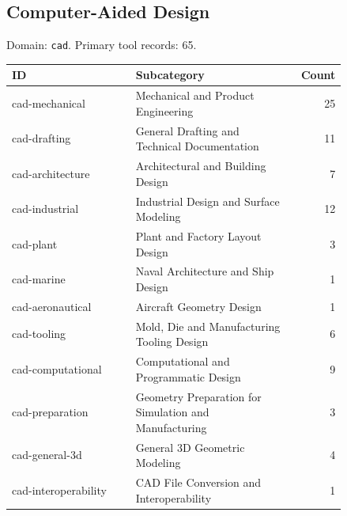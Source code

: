 \subsection{Computer-Aided Design}
\noindent Domain: \texttt{cad}. Primary tool records: 65.
\begin{longtable}{p{0.37\linewidth}p{0.47\linewidth}r}
ID & Subcategory & Count\\\hline\endhead
cad-mechanical & Mechanical and Product Engineering & 25\\
cad-drafting & General Drafting and Technical Documentation & 11\\
cad-architecture & Architectural and Building Design & 7\\
cad-industrial & Industrial Design and Surface Modeling & 12\\
cad-plant & Plant and Factory Layout Design & 3\\
cad-marine & Naval Architecture and Ship Design & 1\\
cad-aeronautical & Aircraft Geometry Design & 1\\
cad-tooling & Mold, Die and Manufacturing Tooling Design & 6\\
cad-computational & Computational and Programmatic Design & 9\\
cad-preparation & Geometry Preparation for Simulation and Manufacturing & 3\\
cad-general-3d & General 3D Geometric Modeling & 4\\
cad-interoperability & CAD File Conversion and Interoperability & 1\\
\end{longtable}
